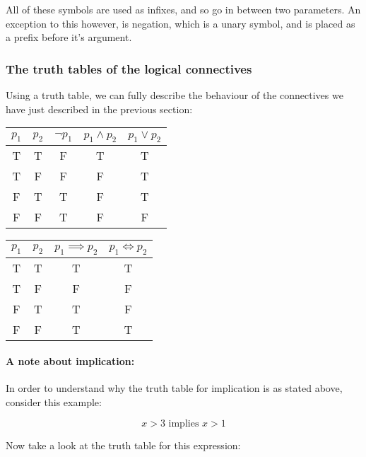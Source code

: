 
All of these symbols are used as infixes, and so go in between two parameters.
An exception to this however, is negation, which is a unary symbol, and is
placed as a prefix before it's argument.


\subsubsection{The truth tables of the logical connectives}

Using a truth table, we can fully describe the behaviour of the connectives we
have just described in the previous section:

\begin{center}
	\begin{tabular}{|c|c|c|c|c|}
		\hline
		$p_1$& $p_2$& $\neg p_1$& $p_1 \wedge p_2$& $p_1 \vee p_2$\\ \hline
		T& T& F& T &T\\
		T& F& F& F &T\\
		F& T& T& F &T\\
		F& F& T& F &F\\ \hline
	\end{tabular}
	\begin{tabular}{|c|c|c|c|}
		\hline
		$p_1$& $p_2$& $p_1 \implies p_2$& $p_1 \iff p_2$\\ \hline
		T& T& T &T\\
		T& F& F &F\\
		F& T& T &F\\
		F& F& T &T\\ \hline
	\end{tabular}
\end{center}

\paragraph{A note about implication:}
In order to understand why the truth table for implication is as stated above,
consider this example:

\begin{dmath}
	{x > 3 \textrm{ implies } x > 1}
\end{dmath}

Now take a look at the truth table for this expression:


